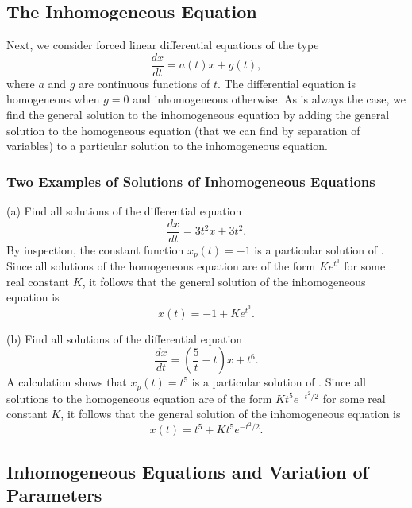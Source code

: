 \documentclass{ximera}
\begin{document}
\subsection*{The Inhomogeneous Equation}

Next, we consider forced linear differential equations of the type
\begin{equation}   \label{eq:linode1}
\frac{dx}{dt} = a(t)x + g(t),
\end{equation}
where $a$ and $g$ are continuous functions of $t$.  The differential  
equation  is homogeneous when $g=0$  and 
 inhomogeneous otherwise.  As is always the 
case, we find the general solution 
to the inhomogeneous equation 
by adding the general solution to the homogeneous equation (that
we can find by separation of variables) to a particular solution to 
the inhomogeneous equation.  

\subsubsection*{Two Examples of Solutions of Inhomogeneous Equations}

(a) Find all solutions of the differential equation
\begin{equation} \label{E:ie1}
\frac{dx}{dt} = 3t^2x + 3t^2.
\end{equation}
By inspection, the constant function $x_p(t)=-1$ is a 
particular solution 
of . 
Since all solutions of the homogeneous equation are of the form $Ke^{t^3}$
for some real constant $K$, it follows that the general solution of the 
inhomogeneous equation is
\[
x(t) = -1 + Ke^{t^3}.
\]

\noindent (b) Find all solutions of the differential equation
\begin{equation}  \label{E:ie2}
\frac{dx}{dt} = \left(\frac{5}{t}-t\right) x + t^6.
\end{equation}
A calculation shows that $x_p(t)=t^5$ is a particular solution of . 
Since all solutions to the homogeneous equation are of the form 
$Kt^5 e^{-t^2/2}$ for some real constant $K$, it follows that the general
solution of the inhomogeneous equation is
\[
x(t) = t^5 + Kt^5 e^{-t^2/2}.
\]

\subsection*{Inhomogeneous Equations and Variation of Parameters}
\end{document}
